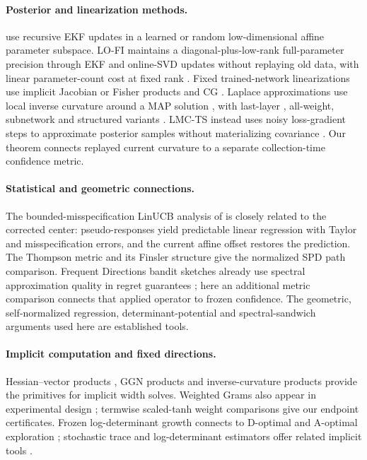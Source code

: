 \paragraph{Posterior and linearization methods.}
\citet{duranmartin2022efficient} use recursive EKF updates in a learned or random
low-dimensional affine parameter subspace. LO-FI maintains a
 diagonal-plus-low-rank full-parameter precision through EKF and online-SVD updates
without replaying old data, with linear parameter-count cost at fixed rank
\citep{chang2023lowrank}. Fixed trained-network linearizations use implicit
Jacobian or Fisher products and CG \citep{maddox2021fast}. Laplace approximations
use local inverse curvature around a MAP solution \citep{mackay1992practical},
with last-layer \citep{kristiadi2020being}, all-weight, subnetwork and structured
variants \citep{daxberger2021laplace,ritter2018scalable,martens2015optimizing}.
LMC-TS instead uses noisy loss-gradient steps to approximate posterior samples
without materializing covariance \citep{xu2022langevin}. Our theorem connects
replayed current curvature to a separate collection-time confidence metric.

\paragraph{Statistical and geometric connections.}
The bounded-misspecification LinUCB analysis of
\citet[Appendix~E]{lattimore2020learning} is closely related to the corrected
center: pseudo-responses yield predictable linear regression with Taylor and
misspecification errors, and the current affine offset restores the prediction.
The Thompson metric \citep{thompson1963certain} and its Finsler structure
\citep{nussbaum1994finsler} give the normalized SPD path comparison.
Frequent Directions bandit sketches already use spectral approximation quality
in regret guarantees \citep{kuzborskij2019efficient}; here an additional metric
comparison connects that applied operator to frozen confidence. The geometric,
self-normalized regression, determinant-potential and spectral-sandwich
arguments used here are established tools.

\paragraph{Implicit computation and fixed directions.}
Hessian--vector products \citep{pearlmutter1994fast}, GGN products
\citep{schraudolph2002fast} and inverse-curvature products
\citep{koh2017understanding} provide the primitives for implicit width solves.
Weighted Grams also appear in experimental design
\citep{lattimore2020learning}; termwise scaled-tanh weight comparisons give our
endpoint certificates. Frozen log-determinant growth connects to D-optimal and
A-optimal exploration \citep{valko2013finite}; stochastic trace and log-determinant
estimators offer related implicit tools \citep{ubaru2017fast}.
